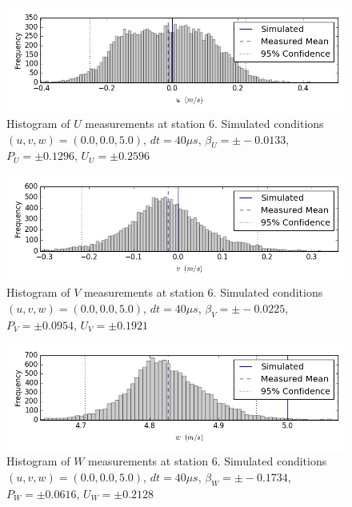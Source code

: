 \begin{figure}[H]
\centering
\includegraphics[width=6in]{figs/Ely_May28th06001/uncertainty_Ely_May28th06001_U}
\caption{Histogram of $U$ measurements at station 6. Simulated conditions $(u,v,w)=(0.0, 0.0, 5.0)$, $dt=40 \mu s$, $\beta_U=\pm -0.0133$, $P_U=\pm 0.1296$, $U_U=\pm 0.2596$}
\label{fig:uncertainty_Ely_May28th06001_U}
\end{figure}


\begin{figure}[H]
\centering
\includegraphics[width=6in]{figs/Ely_May28th06001/uncertainty_Ely_May28th06001_V}
\caption{Histogram of $V$ measurements at station 6. Simulated conditions $(u,v,w)=(0.0, 0.0, 5.0)$, $dt=40 \mu s$, $\beta_V=\pm -0.0225$, $P_V=\pm 0.0954$, $U_V=\pm 0.1921$}
\label{fig:uncertainty_Ely_May28th06001_V}
\end{figure}


\begin{figure}[H]
\centering
\includegraphics[width=6in]{figs/Ely_May28th06001/uncertainty_Ely_May28th06001_W}
\caption{Histogram of $W$ measurements at station 6. Simulated conditions $(u,v,w)=(0.0, 0.0, 5.0)$, $dt=40 \mu s$, $\beta_W=\pm -0.1734$, $P_W=\pm 0.0616$, $U_W=\pm 0.2128$}
\label{fig:uncertainty_Ely_May28th06001_W}
\end{figure}


